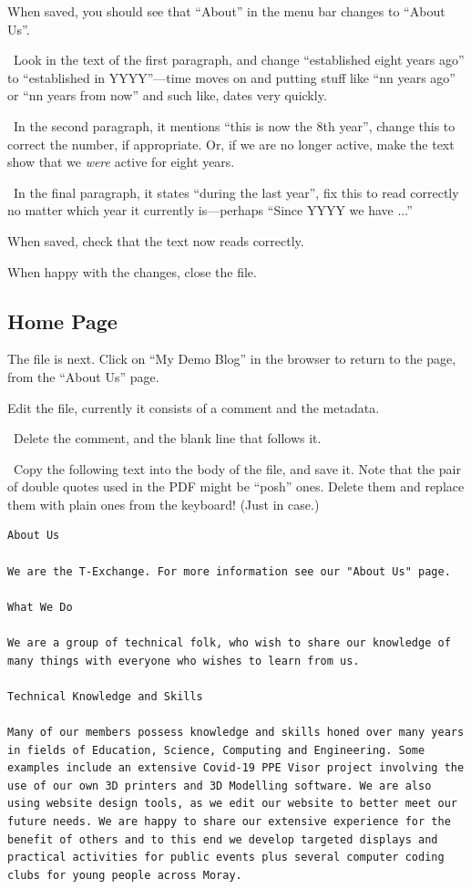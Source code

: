 When saved, you should see that ``About'' in the menu bar changes to ``About Us''.

\lyxarrow{}~Look in the text of the first paragraph, and change ``established eight years ago'' to ``established in YYYY''---time moves on and putting stuff like ``nn years ago'' or ``nn years from now'' and such like, dates very quickly.

\lyxarrow{}~In the second paragraph, it mentions ``this is now the 8th year'', change this to correct the number, if appropriate. Or, if we are no longer active, make the text show that we \emph{were} active for eight years.

\lyxarrow{}~In the final paragraph, it states ``during the last year'', fix this to read correctly no matter which year it currently is---perhaps ``Since YYYY we have ...''

When saved, check that the text now reads correctly.

When happy with the changes, close the file.

\subsection{Home Page}

The  file is next. Click on ``My Demo Blog'' in the browser to return to the page, from the ``About Us'' page.

Edit the  file, currently it consists of a comment and the metadata.

\lyxarrow{}~Delete the comment, and the blank line that follows it.

\lyxarrow{}~Copy the following text into the body of the file, and save it. Note that the pair of double quotes used in the PDF might be ``posh'' ones. Delete them and replace them with plain ones from the keyboard! (Just in case.)

\begin{lstlisting}[style=myText]
About Us

We are the T-Exchange. For more information see our "About Us" page.

What We Do

We are a group of technical folk, who wish to share our knowledge of many things with everyone who wishes to learn from us.

Technical Knowledge and Skills

Many of our members possess knowledge and skills honed over many years in fields of Education, Science, Computing and Engineering. Some examples include an extensive Covid-19 PPE Visor project involving the use of our own 3D printers and 3D Modelling software. We are also using website design tools, as we edit our website to better meet our future needs. We are happy to share our extensive experience for the benefit of others and to this end we develop targeted displays and practical activities for public events plus several computer coding clubs for young people across Moray.
\end{lstlisting}

